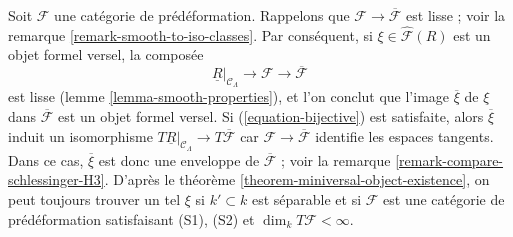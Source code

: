 \begin{remark}
\label{remark-compose-minimal-into-iso-classes}
Soit $\mathcal{F}$ une catégorie de prédéformation. Rappelons que
$\mathcal{F} \to \overline{\mathcal{F}}$ est lisse ; voir la remarque
\ref{remark-smooth-to-iso-classes}. Par conséquent, si
$\xi \in \widehat{\mathcal{F}}(R)$ est un objet formel versel, la composée
$$
\underline{R}|_{\mathcal{C}_\Lambda} \longrightarrow
\mathcal{F} \longrightarrow \overline{\mathcal{F}}
$$
est lisse (lemme \ref{lemma-smooth-properties}), et l'on conclut que l'image
$\overline{\xi}$ de $\xi$ dans $\overline{\mathcal{F}}$ est un objet formel
versel. Si (\ref{equation-bijective}) est satisfaite, alors
$\overline{\xi}$ induit un isomorphisme
$T\underline{R}|_{\mathcal{C}_\Lambda} \to T\overline{\mathcal{F}}$
car $\mathcal{F} \to \overline{\mathcal{F}}$ identifie les espaces tangents.
Dans ce cas, $\overline{\xi}$ est donc une enveloppe de
$\overline{\mathcal{F}}$ ; voir la remarque
\ref{remark-compare-schlessinger-H3}. D'après le théorème
\ref{theorem-miniversal-object-existence}, on peut toujours trouver un tel
$\xi$ si $k' \subset k$ est séparable et si $\mathcal{F}$ est une catégorie
de prédéformation satisfaisant (S1), (S2) et
$\dim_k T\mathcal{F} < \infty$.
\end{remark}

